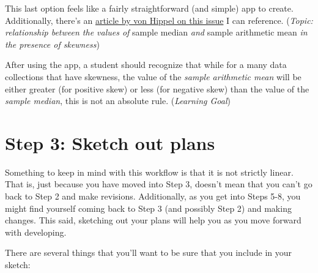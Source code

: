 \documentclass[
]{book}
\begin{document}
This last option feels like a fairly straightforward (and simple) app to create. Additionally, there's an \href{http://jse.amstat.org/v13n2/vonhippel.html}{article by von Hippel on this issue} I can reference. (\emph{Topic: relationship between the values of }sample median \emph{and} sample arithmetic mean \emph{in the presence of skewness})

After using the app, a student should recognize that while for a many data collections that have skewness, the value of the \emph{sample arithmetic mean} will be either greater (for positive skew) or less (for negative skew) than the value of the \emph{sample median}, this is not an absolute rule. (\emph{Learning Goal})

\hypertarget{step3}{%
\section{Step 3: Sketch out plans}\label{step3}}

Something to keep in mind with this workflow is that it is not strictly linear. That is, just because you have moved into Step 3, doesn't mean that you can't go back to Step 2 and make revisions. Additionally, as you get into Steps 5-8, you might find yourself coming back to Step 3 (and possibly Step 2) and making changes. This said, sketching out your plans will help you as you move forward with developing.

There are several things that you'll want to be sure that you include in your sketch:
\end{document}
